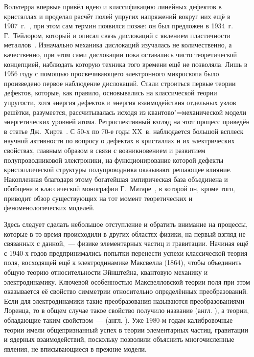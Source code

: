 \documentclass[a4paper, 14pt, titlepage]{extarticle}
\begin{document}
  Вольтерра впервые привёл идею и классификацию линейных дефектов в кристаллах и проделал расчёт
  полей упругих напряжений вокруг них ещё в 1907~г.~\cite{volterra-1907}, при этом сам термин
   появился позже: он был предложен в 1934~г. Г.~Тейлором, который и описал связь
  дислокаций с явлением пластичности металлов~\cite{taylor-plastic}.
  Изначально механика дислокаций изучалась не количественно, а качественно, при этом сами дислокации
  пока оставались чисто теоретической концепцией, наблюдать которую техника того времени ещё не
  позволяла. Лишь в 1956 году с помощью просвечивающего электронного микроскопа было произведено
  первое наблюдение дислокаций. Стали строиться первые теории дефектов, которые, как правило,
  основывались на классической теории упругости, хотя энергия дефектов и энергия взаимодействия
  отдельных узлов решётки, разумеется, рассчитывалась исходя из квантово"=механической модели
  энергетических уровней атома. Ретроспективный взгляд на этот процесс приведён в статье
  Дж.~Хирта~\cite{hirth-history}.  С 50-х по 70-е годы XX~в. наблюдается большой всплеск научной
  активности по вопросу о дефектах в кристаллах и их электрических свойствах, главным образом в
  связи с возникновением и развитием полупроводниковой электроники, на функционирование которой
  дефекты кристаллической структуры полупроводника оказывают решающее влияние. Накопленная благодаря
  этому богатейшая эмпирическая база объединена и обобщена в классической монографии
  Г.~Матаре~\cite{matare-defects}, в которой он, кроме того, приводит обзор существующих на тот
  момент теоретических и феноменологических моделей.

  Здесь следует сделать небольшое отступление и обратить внимание на процессы, которые в то время
  происходили в других областях физики, на первый взгляд не связанных с данной,~--- физике
  элементарных частиц и гравитации. Начиная ещё с 1940-х годов предпринимались попытки перенести
  успехи классической теория поля, восходящей ещё к электродинамике Максвелла (1864), чтобы
  объединить общую теорию относительности Эйнштейна, квантовую механику и электродинамику. Ключевой
  особенностью Максвелловской теории поля при этом оказывается её свойство симметрии относительно
  определённых преобразований. Если для электродинамики такие преобразования называются
  преобразованиями Лоренца, то в общем случае такое свойство получило название  (англ. ), а теории, обладающие таким свойством~---
   (англ. ). Уже 1980-м годам калибровочные теории
  имели общепризнанный успех в теории элементарных частиц, гравитации и ядерных взаимодействий,
  поскольку позволили объяснить многочисленные явления, не вписывающиеся в прежние модели.
\end{document}
